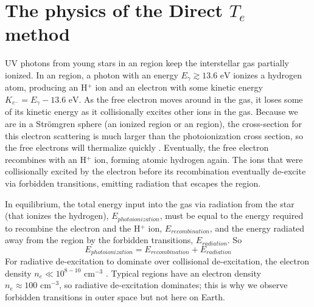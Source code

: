 \chapter[Direct method physics]{The physics of the Direct $T_e$ method}\label{sec:physics}

UV photons from young stars in an  region keep the interstellar gas 
partially ionized.  In an  region, a photon with an energy 
$E_\gamma \gtrsim 13.6\text{ eV}$ ionizes a hydrogen atom, producing an H$^+$ 
ion and an electron with some kinetic energy 
$K_{e^-} = E_\gamma - 13.6\text{ eV}$.  As the free electron moves around in the 
gas, it loses some of its kinetic energy as it collisionally excites other ions 
in the gas.  Because we are in a Str\"{o}mgren sphere (an ionized region or an 
 region), the cross-section for this electron scattering is much 
larger than the photoionization cross section, so the free electrons will 
thermalize quickly \citep{DeRobertis87}.  Eventually, the free electron 
recombines with an H$^+$ ion, forming atomic hydrogen again.  The ions that were 
collisionally excited by the electron before its recombination eventually 
de-excite via forbidden transitions, emitting radiation that escapes the 
 region.

In equilibrium, the total energy input into the gas via radiation from the star 
(that ionizes the hydrogen), $E_{photoionization}$, must be equal to the energy 
required to recombine the electron and the H$^+$ ion, $E_{recombination}$, and 
the energy radiated away from the  region by the forbidden 
transitions, $E_{radiation}$.  So
\begin{equation}
    E_{photoionization} = E_{recombination} + E_{radiation}
\end{equation}
For radiative de-excitation to dominate over collisional de-excitation, the 
electron density $n_e \ll 10^{8-10}\text{ cm}^{-3}$ \citep{DeRobertis87}.  
Typical  regions have an electron density 
$n_e \approx 100\text{ cm}^{-3}$, so radiative de-excitation dominates; this is 
why we observe forbidden transitions in outer space but not here on Earth.


